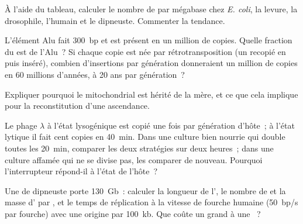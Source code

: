 \begin{exercise}[$\star\star$]\label{exo:b1:genomes:7}
À l'aide du tableau, calculer le nombre de  par mégabase chez
\emph{E. coli}, la levure, la drosophile, l'humain et le dipneuste.
Commenter la tendance.
\end{exercise}

\begin{exercise}[$\star\star$]\label{exo:b1:genomes:8}
L'élément Alu fait \qty{300}{bp} et est présent en un million de
copies. Quelle fraction du  est de l'Alu~? Si chaque copie est
née par rétrotransposition (un  recopié en  puis inséré), combien
d'insertions par génération donneraient un million de copies en
\num{60} millions d'années, à \num{20} ans par génération~?
\end{exercise}

\begin{exercise}[$\star\star$]\label{exo:b1:genomes:9}
Expliquer pourquoi le  mitochondrial est hérité de la mère, et ce
que cela implique pour la reconstitution d'une ascendance.
\end{exercise}

\begin{exercise}[$\star\star\star$]\label{exo:b1:genomes:10}
Le phage $\lambda$ à l'état lysogénique est copié une fois par
génération d'hôte~; à l'état lytique il fait cent copies en
\qty{40}{min}. Dans une culture bien nourrie qui double toutes les
\qty{20}{min}, comparer les deux stratégies sur deux heures~; dans une
culture affamée qui ne se divise pas, les comparer de nouveau. Pourquoi
l'interrupteur répond-il à l'état de l'hôte~?
\end{exercise}

\begin{exercise}[$\star\star\star$]\label{exo:b1:genomes:11}
Une  de dipneuste porte \qty{130}{Gb}~: calculer la longueur de
l', le nombre de  et la masse d' par , et
le temps de réplication à la vitesse de fourche humaine
(\qty{50}{bp/s} par fourche) avec une origine par \qty{100}{kb}. Que
coûte un grand  à une ~?
\end{exercise}

